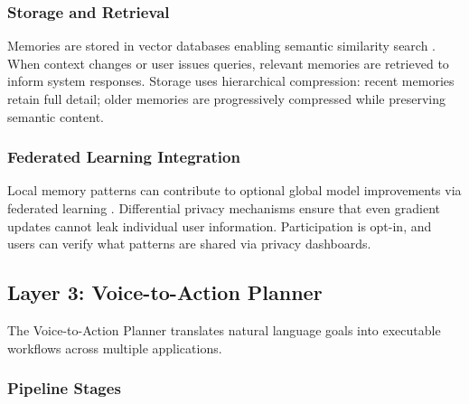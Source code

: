 \documentclass[conference]{IEEEtran}
\begin{document}
\subsubsection{Storage and Retrieval}

Memories are stored in vector databases enabling semantic similarity search \cite{johnson2019billion}. When context changes or user issues queries, relevant memories are retrieved to inform system responses. Storage uses hierarchical compression: recent memories retain full detail; older memories are progressively compressed while preserving semantic content.

\subsubsection{Federated Learning Integration}

Local memory patterns can contribute to optional global model improvements via federated learning \cite{kairouz2021advances}. Differential privacy mechanisms \cite{dwork2006differential} ensure that even gradient updates cannot leak individual user information. Participation is opt-in, and users can verify what patterns are shared via privacy dashboards.

\subsection{Layer 3: Voice-to-Action Planner}

The Voice-to-Action Planner translates natural language goals into executable workflows across multiple applications.

\subsubsection{Pipeline Stages}
\end{document}
